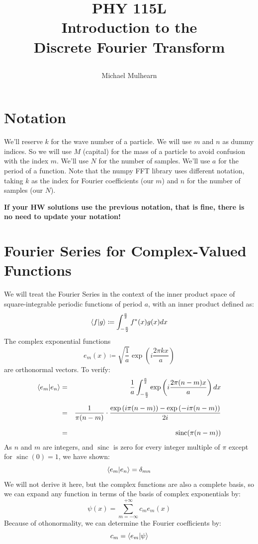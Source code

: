 \documentclass[12pt]{article}
\DeclareMathOperator{\sinc}{sinc}
\begin{document}
\title{PHY 115L \\
Introduction to the \\
Discrete Fourier Transform \\ 
\author{Michael Mulhearn}}

\maketitle

\section{Notation}

We'll reserve $k$ for the wave number of a particle.  We will use $m$
and $n$ as dummy indices.  So we will use $M$ (capital) for the mass
of a particle to avoid confusion with the index $m$.  We'll use $N$
for the number of samples.  We'll use $a$ for the period of a
function.  Note that the numpy FFT library uses different notation,
taking $k$ as the index for Fourier coefficients (our $m$) and $n$ for
the number of samples (our $N$).

{\bf If your HW solutions use the previous notation, that is fine, there is no need to update your notation!}

\section{Fourier Series for Complex-Valued Functions}

We will treat the Fourier Series in the context of the inner product
space of square-integrable periodic functions of period $a$, with an
inner product defined as:
$$ \braket{f|g} \coloneqq \int_{-\frac{a}{2}}^{\frac{a}{2}} f^*(x) g(x) dx$$
The complex exponential functions
$$e_m(x) \coloneqq \sqrt{\frac{1}{a}} \exp\left(i \frac{2\pi k x}{a}\right)$$
are orthonormal vectors.  To verify:
\begin{eqnarray*}
  \braket{e_m|e_n} &=& \frac{1}{a} \int_{-\frac{a}{2}}^{\frac{a}{2}}
  \exp\left(i \frac{2\pi (n-m) x}{a}\right) dx \\[7pt]
  &=& \frac{1}{\pi (n-m)} \cdot \frac{\exp\left(i \pi (n-m) \right)-\exp\left(-i \pi (n-m) \right)}{2i}\\[7pt]
  &=& \sinc(\pi (n-m))
\end{eqnarray*}
As $n$ and $m$ are integers, and $\sinc$ is zero for every integer multiple of $\pi$ except for $\sinc(0)=1$, we have shown:
\begin{equation}
  \braket{e_m|e_n} = \delta_{mn}
\end{equation}
We will not derive it here, but the complex functions are also a complete basis, so we can expand any function in terms of the basis of complex exponentials by:
\begin{equation}
 \psi(x) = \sum_{m=-\infty}^{+\infty} c_m e_m (x)
\end{equation}
Because of othonormality, we can determine the Fourier coefficients by:
\begin{equation}
c_m = \braket{e_m | \psi}
\end{equation}
\end{document}
